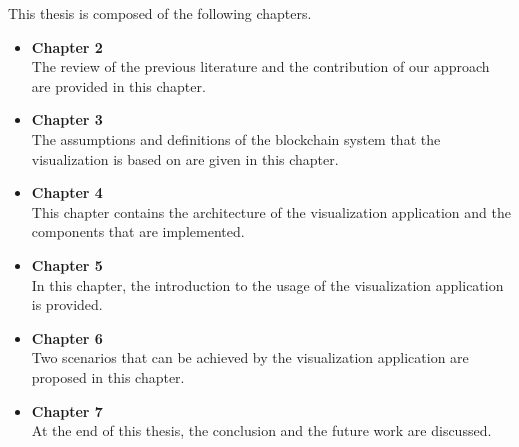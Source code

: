 This thesis is composed of the following chapters.

\begin{itemize}
    \item \textbf{Chapter 2} \\
        The review of the previous literature and the contribution of our approach are provided in this chapter.
    \item \textbf{Chapter 3} \\
        The assumptions and definitions of the blockchain system that the visualization is based on are given in this chapter.
    \item \textbf{Chapter 4} \\
        This chapter contains the architecture of the visualization application and the components that are implemented.
    \item \textbf{Chapter 5} \\
        In this chapter, the introduction to the usage of the visualization application is provided.
    \item \textbf{Chapter 6} \\
        Two scenarios that can be achieved by the visualization application are proposed in this chapter.
    \item \textbf{Chapter 7} \\
        At the end of this thesis, the conclusion and the future work are discussed.
\end{itemize}
